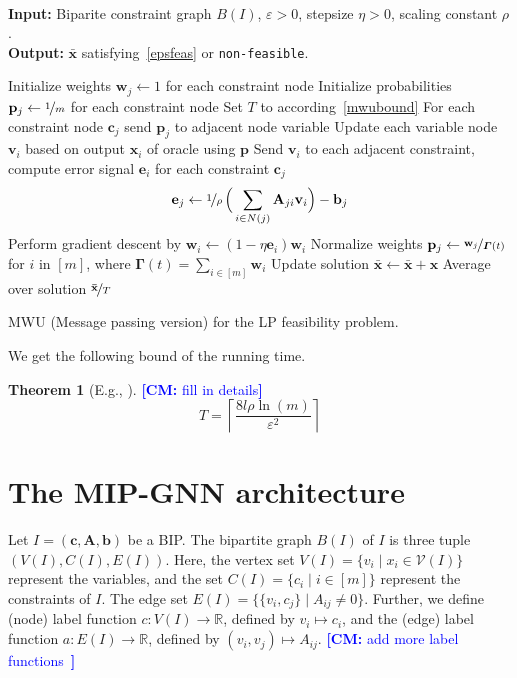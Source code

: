 \documentclass[11pt, DIV=12]{scrartcl}
\theoremstyle{definition}
\newtheorem{theorem}{Theorem}
\newcommand{\cV}{\ensuremath{{\mathcal V}}\xspace}
\newcommand{\bbR}{\ensuremath{\mathbb{R}}}
\renewcommand{\vec}[1]{\mathbf{#1}}
\newcommand{\cm}[1]{{{\textcolor{blue}{\textbf{[CM:} {#1}\textbf{]}}}}}
\begin{document}
\begin{algorithm}[H]\mbox{\hfill}
	\\\textbf{Input:} Biparite constraint graph $B(I)$, $\varepsilon > 0$,  stepsize $\eta > 0$, scaling constant $\rho$. \\
	\textbf{Output:} $\vec{\bar{x}}$ satisfying~\cref{epsfeas} or \texttt{non-feasible}.
	\begin{algorithmic}[1]
		\State Initialize weights $\vec{w}_j \leftarrow 1$ for each constraint node
		\State Initialize probabilities $\vec{p}_j \leftarrow \nicefrac{1}{m}$ for each constraint node
		\State Set $T$ to according~\cref{mwubound}
		\State For each constraint node $\vec{c}_j$ send $\vec{p}_j$ to adjacent node variable
		\Statex
		\State Update each variable node $\vec{v}_i$ based on output $\vec{x}_i$ of oracle using $\vec{p}$
		\State Send $\vec{v}_i$ to each adjacent constraint, compute error signal $\vec{e}_i$ for each constraint $\vec{c}_j$
		\begin{equation*}
		\vec{e}_j \leftarrow \nicefrac{1}{\rho}\,\Big(\sum_{i \in N(j)} \label{key}\vec{A}_{ji}  \vec{v}_i \Big) - \vec{b}_j   
		\end{equation*}
		\State Perform gradient descent by $\vec{w}_i \leftarrow (1 - \eta \vec{e}_i) \vec{w}_i$ 
		\State Normalize weights $\vec{p}_j \leftarrow \nicefrac{\vec{w}_j}{\boldsymbol{\Gamma}(t)} $  for $i$ in $[m]$, where $\boldsymbol{\Gamma}(t) = \sum_{i \in [m]} \vec{w}_i$
		\State Update solution $\vec{\bar{x}} \leftarrow \vec{\bar{x}} + \vec{x}$
		\EndFor
		\State \Return Average over solution $ \nicefrac{\vec{\bar{x}}}{T}$
	\end{algorithmic}
	\caption{MWU (Message passing version) for the LP feasibility problem.}
	\label{alg:as}
\end{algorithm}

We get the following bound of the running time.
\begin{theorem}[E.g., \cite{Aro+2012}]
	\cm{fill in details}
	\begin{equation}\label{mwubound}
		T = \left\lceil \frac{8 l \rho \ln(m)}{\varepsilon^2} \right\rceil 
	\end{equation}
\end{theorem}

\section{The MIP-GNN architecture}


Let $I = (\vec{c}, \vec{A}, \vec{b})$ be a BIP. The bipartite graph $B(I)$ of $I$ is three tuple $(V(I),C(I),E(I))$. Here, the vertex set $V(I) = \{ v_i \mid x_i \in \cV(I) \}$ represent the variables, and the set $C(I) = \{ c_i \mid i \in [m]  \}$ represent the constraints of $I$. The edge set $E(I) = \{ \{ v_i,c_j \} \mid A_{ij} \neq 0 \}$. Further, we define (node) label function $c\colon V(I) \to \bbR$, defined by $v_i \mapsto c_i$, and the (edge) label function $a \colon E(I) \to \bbR$, defined by  $(v_i,v_j) \mapsto A_{ij}$.
\cm{add more label functions }
\end{document}
